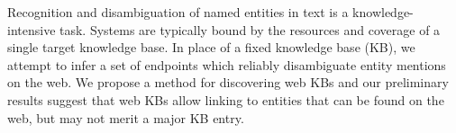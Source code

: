 Recognition and disambiguation of named entities in text is a knowledge-intensive  task. Systems are typically bound by the resources and coverage of a single target knowledge base. In place of a fixed knowledge base (KB), we attempt to infer a set of endpoints which reliably disambiguate entity mentions on the web. We  propose a method for discovering web KBs and our preliminary results suggest that web KBs allow linking to entities that can be found on the web, but may not merit a major KB entry.

